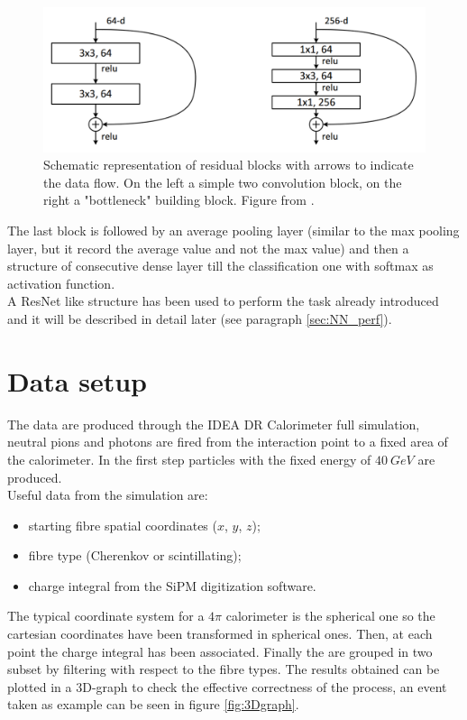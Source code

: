 \begin{figure}
	\centering
	\includegraphics[width=.7\textwidth]{IMG/Cap6/ResNet_scheme.png}
	\caption{Schematic representation of residual blocks with arrows to indicate the data flow. On the left a simple two convolution block, on the right a "bottleneck" building block. Figure from \cite{ResNetArt}.}
	\label{fig:ResNet_scheme}
\end{figure}

The last block is followed by an average pooling layer (similar to the max pooling layer, but it record the average value and not the max value) and then a structure of consecutive dense layer till the classification one with softmax as activation function.\\

A ResNet like structure has been used to perform the task already introduced and it will be described in detail later (see paragraph \ref{sec:NN_perf}).

\section{Data setup}\label{sec:NN_data}
The data are produced through the IDEA DR Calorimeter full simulation, neutral pions and photons are fired from the interaction point to a fixed area of the calorimeter. In the first step particles with the fixed energy of $40\ GeV$ are produced.\\
Useful data from the simulation are:
\begin{itemize}
    \item starting fibre spatial coordinates ($x$, $y$, $z$);
    \item fibre type (Cherenkov or scintillating);
    \item charge integral from the SiPM digitization software.
\end{itemize}
The typical coordinate system for a $4\pi$ calorimeter is the spherical one so the cartesian coordinates have been transformed in spherical ones. Then, at each point the charge integral has been associated. Finally the are grouped in two subset by filtering with respect to the fibre types. The results obtained can be plotted in a 3D-graph to check the effective correctness of the process, an event taken as example can be seen in figure \ref{fig:3Dgraph}.

